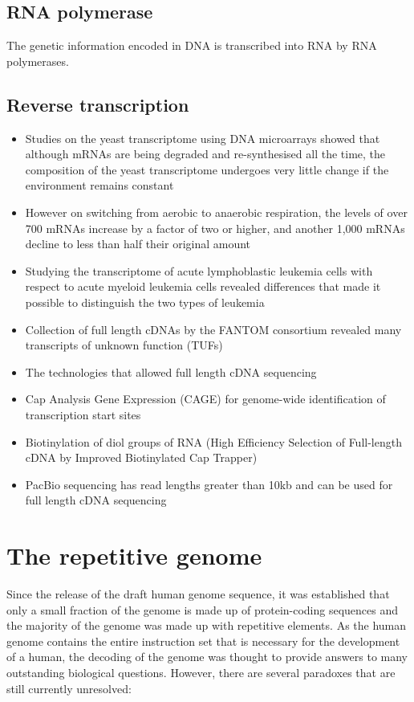 \subsection{RNA polymerase}

The genetic information encoded in DNA is transcribed into RNA by RNA polymerases.

\subsection{Reverse transcription}

\begin{itemize}

   \item Studies on the yeast transcriptome using DNA microarrays showed that although mRNAs are being degraded and re-synthesised all the time, the composition of the yeast transcriptome undergoes very little change if the environment remains constant
   \item However on switching from aerobic to anaerobic respiration, the levels of over 700 mRNAs increase by a factor of two or higher, and another 1,000 mRNAs decline to less than half their original amount
   \item Studying the transcriptome of acute lymphoblastic leukemia cells with respect to acute myeloid leukemia cells revealed differences that made it possible to distinguish the two types of leukemia
   \item Collection of full length cDNAs by the FANTOM consortium revealed many transcripts of unknown function (TUFs)
   \item The technologies that allowed full length cDNA sequencing
   \item Cap Analysis Gene Expression (CAGE) for genome-wide identification of transcription start sites
   \item Biotinylation of diol groups of RNA (High Efficiency Selection of Full-length cDNA by Improved Biotinylated Cap Trapper)
   \item PacBio sequencing has read lengths greater than 10kb and can be used for full length cDNA sequencing

\end{itemize}

\section{The repetitive genome}

Since the release of the draft human genome sequence\cite{venter2001sequence, lander2001initial}, it was established that only a small fraction of the genome is made up of protein-coding sequences and the majority of the genome was made up with repetitive elements. As the human genome contains the entire instruction set that is necessary for the development of a human, the decoding of the genome was thought to provide answers to many outstanding biological questions. However, there are several paradoxes that are still currently unresolved:

